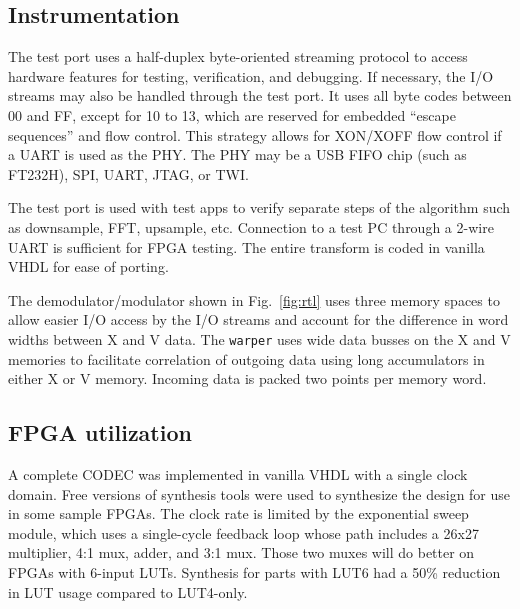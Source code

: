 \subsection{Instrumentation}

The test port uses a half-duplex byte-oriented streaming protocol to access
hardware features for testing, verification, and debugging.
If necessary, the I/O streams may also be handled through the test port.
It uses all byte codes between 00 and FF, except for 10 to 13,
which are reserved for embedded ``escape sequences'' and flow control.
This strategy allows for XON/XOFF flow control if a UART is used as the PHY.
The PHY may be a USB FIFO chip (such as FT232H), SPI, UART, JTAG, or TWI.

The test port is used with test apps to verify separate steps of the
algorithm such as downsample, FFT, upsample, etc.
Connection to a test PC through a 2-wire UART is sufficient for FPGA testing.
The entire transform is coded in vanilla VHDL for ease of porting.

The demodulator/modulator shown in Fig.~\ref{fig:rtl} uses three memory
spaces to allow easier I/O access by the I/O streams and account for the
difference in word widths between X and V data.
The \verb|warper| uses wide data busses on the X and V memories to facilitate
correlation of outgoing data using long accumulators in either X or V memory.
Incoming data is packed two points per memory word.

\subsection {FPGA utilization}

A complete CODEC was implemented in vanilla VHDL with a single clock domain.
Free versions of synthesis tools were used to synthesize the design for use in
some sample FPGAs.
The clock rate is limited by the exponential sweep module,
which uses a single-cycle feedback loop whose path includes a 26x27 multiplier,
4:1 mux, adder, and 3:1 mux. Those two muxes will do better on FPGAs with
6-input LUTs. Synthesis for parts with LUT6 had a 50\% reduction in LUT usage
compared to LUT4-only.

